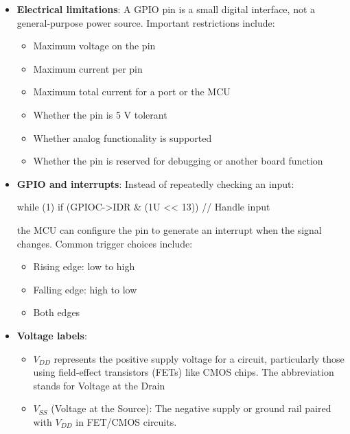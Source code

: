 \documentclass{report}
\begin{document}
\begin{itemize}
\begin{cppcode}
                // Set high
                GPIOA->BSRR = (1U << 5);      // PA5 high
            \end{cppcode}
        \item \textbf{Electrical limitations}: A GPIO pin is a small digital interface, not a general-purpose power source.
            \bigbreak \noindent 
            Important restrictions include:
            \begin{itemize}
                \item Maximum voltage on the pin
                \item Maximum current per pin
                \item Maximum total current for a port or the MCU
                \item Whether the pin is 5 V tolerant
                \item Whether analog functionality is supported
                \item Whether the pin is reserved for debugging or another board function
            \end{itemize}
        \item \textbf{GPIO and interrupts}: Instead of repeatedly checking an input:
            \bigbreak \noindent 
            \begin{cppcode}
                while (1) {
                    if (GPIOC->IDR & (1U << 13)) {
                        // Handle input
                    }
                }
            \end{cppcode}
            \bigbreak \noindent 
            the MCU can configure the pin to generate an interrupt when the signal changes.
            \bigbreak \noindent 
            Common trigger choices include:
            \begin{itemize}
                \item Rising edge: low to high
                \item Falling edge: high to low
                \item Both edges
            \end{itemize}
        \item \textbf{Voltage labels}: 
            \begin{itemize}
                \item \(V_{DD}\) represents the positive supply voltage for a circuit, particularly those using field-effect transistors (FETs) like CMOS chips. The abbreviation stands for Voltage at the Drain
                \item \(V_{SS}\) (Voltage at the Source): The negative supply or ground rail paired with \(V_{DD}\) in FET/CMOS circuits.

\end{itemize}
\end{itemize}
\end{document}
